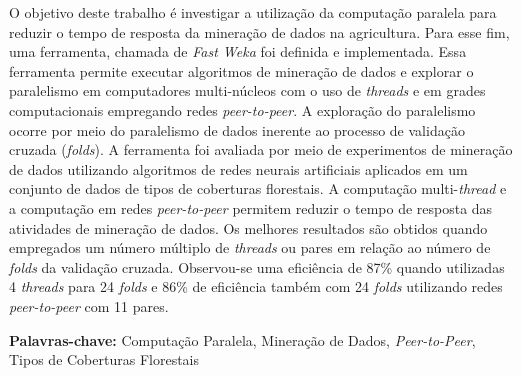 \begin{resumo}

{\noindent

O objetivo deste trabalho é investigar a utilização da computação paralela para reduzir o tempo de resposta da mineração de dados na agricultura. Para esse fim, uma ferramenta, chamada de \textit{Fast Weka} foi definida e implementada. Essa ferramenta permite executar algoritmos de mineração de dados e explorar o paralelismo em computadores multi-núcleos com o uso de \textit{threads} e em grades computacionais empregando redes \textit{peer-to-peer}. A exploração do paralelismo ocorre por meio do paralelismo de dados inerente  ao processo de validação cruzada (\textit{folds}). A ferramenta foi avaliada por meio de experimentos de mineração de dados utilizando algoritmos de redes neurais artificiais aplicados em um conjunto de dados de tipos de coberturas florestais. A computação multi-\textit{thread} e a computação em redes \textit{peer-to-peer} permitem reduzir o tempo de resposta das atividades de mineração de dados. Os melhores resultados são obtidos quando empregados um número múltiplo de \textit{threads} ou pares em relação ao número de \textit{folds} da validação cruzada. Observou-se uma eficiência de 87\% quando utilizadas 4 \textit{threads} para 24 \textit{folds} e 86\% de eficiência também com 24 \textit{folds} utilizando redes \textit{peer-to-peer} com 11 pares. \\

}
{\noindent \textbf{Palavras-chave:} Computação Paralela, Mineração de Dados, \textit{Peer-to-Peer}, Tipos de Coberturas Florestais}

\end{resumo}
